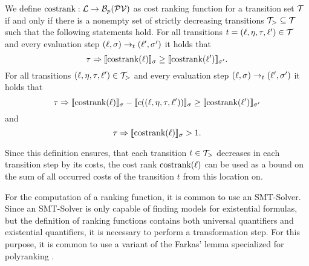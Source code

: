 \begin{definition} 
  We define $\text{costrank}: \mathcal{L} \rightarrow \mathcal{B}_p(\mathcal{PV})$ as cost ranking function for a transition set $\mathcal{T}$ if and only if there is a nonempty set of strictly decreasing transitions $\mathcal{T}_{>} \subseteq \mathcal{T}$ such that the following statements hold.
  For all transitions $t = (\ell, \eta, \tau, \ell') \in \mathcal{T}$ and every evaluation step $(\ell, \sigma) \rightarrow_t (\ell', \sigma')$ it holds that
  \[ \tau \Rightarrow \llbracket \text{costrank}(\ell) \rrbracket_{\sigma} \geq \llbracket \text{costrank}(\ell') \rrbracket_{\sigma'}. \]
  For all transitions $(\ell, \eta, \tau, \ell') \in \mathcal{T}_{>}$ and every evaluation step $(\ell, \sigma) \rightarrow_t (\ell', \sigma')$ it holds that        
  \[ \tau \Rightarrow \llbracket \text{costrank}(\ell) \rrbracket_{\sigma} - \llbracket c((\ell, \eta, \tau, \ell')) \rrbracket_{\sigma} \geq \llbracket \text{costrank}(\ell') \rrbracket_{\sigma'} \]
  and
  \[ \tau \Rightarrow \llbracket \text{costrank}(\ell) \rrbracket_{\sigma} > 1. \]
\end{definition}

Since this definition ensures, that each transition $t \in \mathcal{T}_>$ decreases in each transition step by its costs, the cost rank $\text{costrank}(\ell)$ can be used as a bound on the sum of all occurred costs of the transition $t$ from this location on.


For the computation of a ranking function, it is common to use an SMT-Solver.
Since an SMT-Solver is only capable of finding models for existential formulas, but the definition of ranking functions contains both universal quantifiers and existential quantifiers, it is necessary to perform a transformation step.
For this purpose, it is common to use a variant of the Farkas' lemma \cite{schrijver1998theory} specialized for polyranking \cite{bradley2005polyranking}.

